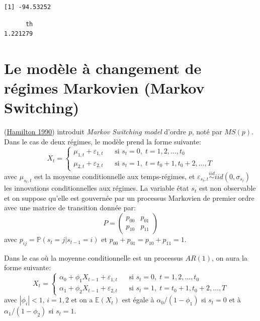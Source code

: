 \documentclass[
  french,
]{article}
\newenvironment{Shaded}{\begin{snugshade}}{\end{snugshade}}
\newcommand{\NormalTok}[1]{#1}
\newcommand{\SpecialCharTok}[1]{\textcolor[rgb]{0.00,0.00,0.00}{#1}}
\begin{document}
\begin{verbatim}
[1] -94.53252
\end{verbatim}

\begin{Shaded}
\end{Shaded}

\begin{verbatim}
      th 
1.221279 
\end{verbatim}

\hypertarget{le-moduxe8le-uxe0-changement-de-ruxe9gimes-markovien-markov-switching}{%
\section{Le modèle à changement de régimes Markovien (Markov
Switching)}\label{le-moduxe8le-uxe0-changement-de-ruxe9gimes-markovien-markov-switching}}

(\protect\hyperlink{ref-hamilton90}{Hamilton 1990}) introduit
\emph{Markov Switching model} d'ordre \(p\), noté par \(MS(p)\). Dans le
cas de deux régimes, le modèle prend la forme suivante: \[
X_t=\begin{cases}
\mu_{1,t}+\varepsilon_{1,t}\;\quad \text{ si }s_t = 0,\; t=1,2,\ldots, t_0\\
\mu_{2,t}+\varepsilon_{2,t}\;\quad \text{ si }s_t=1,\; t=t_0+1,t_0+2,\ldots,T
\end{cases}
\] avec \(\mu_{s_t,t}\) est la moyenne conditionnelle aux temps-régimes,
et \(\varepsilon_{s_t,t}\stackrel{iid}{\sim}iid(0,\sigma_{s_t})\) les
innovations conditionnelles aux régimes. La variable état \(s_t\) est
non observable et on suppose qu'elle est gouvernée par un processus
Markovien de premier ordre avec une matrice de transition donnée par: \[
P=\left( \begin{array}{cc}
p_{00} & p_{01}\\
p_{10} & p_{11}
\end{array}
\right)
\] avec \(p_{ij}=\mathbb{P}(s_t=j|s_{t-1}=i)\) et
\(p_{00}+p_{01}=p_{10}+p_{11}=1\).

Dans le cas où la moyenne conditionnelle est un processus \(AR(1)\), on
aura la forme suivante: \[
X_t=\begin{cases}
\alpha_0+\phi_1 X_{t-1}+\varepsilon_{1,t}\;\quad \text{ si }s_t = 0,\; t=1,2,\ldots, t_0\\
\alpha_1+\phi_2X_{t-1}+\varepsilon_{2,t}\;\quad \text{ si }s_t=1,\; t=t_0+1,t_0+2,\ldots,T
\end{cases}
\] avec \(|\phi_i|<1\), \(i=1,2\) et on a \(\mathbb{E}(X_t)\) est égale
à \(\alpha_0/(1-\phi_1)\) si \(s_t=0\) et à \(\alpha_1/(1-\phi_2)\) si
\(s_t=1\).
\end{document}
